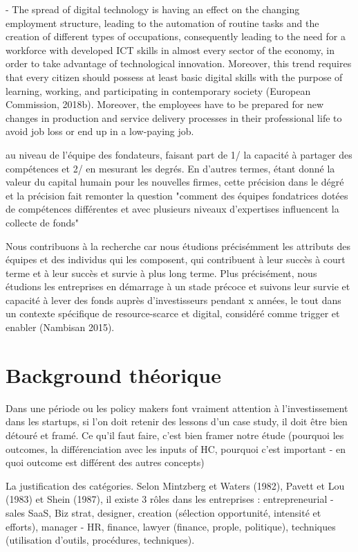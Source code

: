\documentclass[12pt]{article}
\begin{document}
- The spread of digital technology is having an effect on the changing employment structure, leading to the automation of routine tasks and the creation of different types of occupations, consequently leading to the need for a workforce with developed ICT skills in almost every sector of the economy, in order to take advantage of technological innovation. Moreover, this trend requires that every citizen should possess at least basic digital skills with the purpose of learning, working, and participating in contemporary society (European Commission, 2018b). Moreover, the employees have to be prepared for new changes in production and service delivery processes in their professional life to avoid job loss or end up in a low-paying job.

au niveau de l'équipe des fondateurs, faisant part de 1/ la capacité à partager des compétences et 2/ en mesurant les degrés. En d'autres termes, étant donné la valeur du capital humain pour les nouvelles firmes, cette précision dans le dégré et la précision fait remonter la question "comment des équipes fondatrices dotées de compétences différentes et avec plusieurs niveaux d'expertises influencent la collecte de fonds"

Nous contribuons à la recherche car nous étudions précisémment les attributs des équipes et des individus qui les composent, qui contribuent à leur succès à court terme et à leur succès et survie à plus long terme. Plus précisément, nous étudions les entreprises en démarrage à un stade précoce et suivons leur survie et capacité à lever des fonds auprès d'investisseurs pendant x années, le tout dans un contexte spécifique de resource-scarce et digital, considéré comme trigger et enabler (Nambisan 2015).

\section{Background théorique}

Dans une période ou les policy makers font vraiment attention à l'investissement dans les startups, si l'on doit retenir des lessons d'un case study, il doit être bien détouré et framé. Ce qu'il faut faire, c'est bien framer notre étude (pourquoi les outcomes, la différenciation avec les inputs of HC, pourquoi c'est important - en quoi outcome est différent des autres concepts)

La justification des catégories.
Selon Mintzberg et Waters (1982), Pavett et Lou (1983) et Shein (1987), il existe 3 rôles dans les entreprises : entrepreneurial - sales SaaS, Biz strat, designer, creation (sélection opportunité, intensité et efforts), manager - HR, finance, lawyer (finance, prople, politique), techniques (utilisation d'outils, procédures, techniques).
\end{document}
